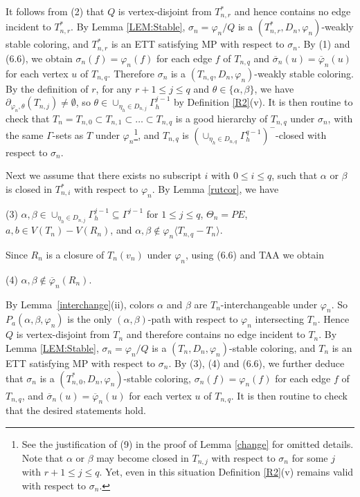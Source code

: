 \documentclass[11pt]{article}
\newcommand{\phibar}{\overline{\varphi}}
\begin{document}
It follows from (2) that $Q$ is vertex-disjoint from $T_{n,r}^*$ and hence contains no edge incident to $T_{n,r}^*$. 
By Lemma \ref{LEM:Stable}, $\sigma_n=\varphi_n/Q$ is a $(T_{n,r}^*,D_n,\varphi_n)$-weakly stable coloring, and $T_{n,r}^*$ 
is an ETT satisfying MP with respect to $\sigma_n$. By (1) and (6.6), we obtain $\sigma_n(f)=\varphi_n(f)$ for each edge $f$ of $T_{n,q}$ and $\overline{\sigma}_n(u)=\phibar_n(u)$ for each vertex $u$ of $T_{n,q}$.  Therefore $\sigma_n$ is a $(T_{n,q}, D_n,\varphi_n)$-weakly stable coloring. By the definition of $r$, for any $r+1\le j \le q$ and $\theta \in \{\alpha,\beta\}$, we have $\partial_{\varphi_n, \theta}(T_{n,j})\ne \emptyset$, so $\theta \in \cup_{\eta_h\in D_{n,j}}\Gamma^{j-1}_h$ by
Definition \ref{R2}(v). It is then routine to check that $T_n=T_{n,0} \subset T_{n,1} \subset \ldots \subset T_{n,q}$ is a good 
hierarchy of $T_{n,q}$  under $\sigma_n$, with the same $\Gamma$-sets as $T$ under $\varphi_n$\footnote{See the justification
of (9) in the proof of Lemma \ref{change} for omitted details. Note that $\alpha$ or $\beta$ may become closed in $T_{n,j}$ 
with respect to $\sigma_n$ for some $j$ with $r+1\le j \le q$. Yet, even in this situation Definition \ref{R2}(v) remains valid with respect to $\sigma_n$.}, and $T_{n,q}$ is $(\cup_{\eta_h\in D_{n,q}}\Gamma^{q-1}_h)^-$-closed with respect to $\sigma_n$. 

Next we assume that there exists no subscript $i$ with $0\le i \le q$, such that $\alpha$ or $\beta$ is closed 
in $T^*_{n,i}$ with respect to $\varphi_n$. By Lemma \ref{rutcor}, we have

(3) $\alpha, \beta\in \cup_{\eta_h\in D_{n,j}}\Gamma^{j-1}_h \subseteq \Gamma^{j-1}$ for $1 \le j \le q$, 
$\Theta_n=PE$, $a, b\in V(T_n)-V(R_n)$, and $\alpha, \beta \notin \varphi_n \langle T_{n,q}- T_n \rangle$.  

Since $R_n$ is a closure of $T_n(v_n)$ under $\varphi_n$, using (6.6) and TAA we obtain 

(4) $\alpha, \beta \notin \overline{\varphi}_n (R_n)$.

By Lemma~\ref{interchange}(ii), colors $\alpha$ and $\beta$ are $T_n$-interchangeable under $\varphi_n$. So $P_{a}(\alpha,\beta,\varphi_n)$ is the only $(\alpha,\beta)$-path with respect to $\varphi_n$ intersecting 
$T_n$. Hence $Q$ is vertex-disjoint from $T_n$ and therefore contains no edge incident to  $T_n$.  
By Lemma \ref{LEM:Stable}, $\sigma_n=\varphi_n/Q$ is a $(T_n, D_n,\varphi_n)$-stable coloring, and 
$T_n$ is an ETT satisfying MP with respect to $\sigma_n$. By (3), (4) and (6.6), we further deduce that
$\sigma_n$ is a $(T_{n,0}^*, D_n,\varphi_n)$-stable coloring, $\sigma_n(f)=\varphi_n(f)$ for each 
edge $f$ of $T_{n,q}$, and $\overline{\sigma}_n(u)=\phibar_n(u)$ for each vertex $u$ of $T_{n,q}$. It is then routine 
to check that the desired statements hold.  
\end{document}
